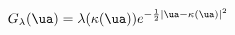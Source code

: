 \begin{equation}
\label{GSchwartz}
G_\lambda(\ua)=
\lambda(\kappa(\ua))e^{-\frac{1}{2}
|\ua-\kappa(\ua)|^2}
\end{equation}


